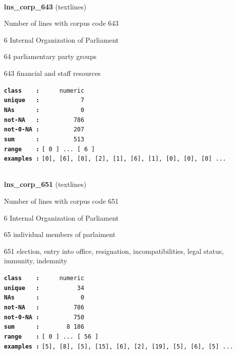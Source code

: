 \documentclass[]{article}
\begin{document}
~

\textbf{lns\_corp\_643} (textlines)

Number of lines with corpus code 643

6 Internal Organization of Parliament

64 parliamentary party groups

643 financial and staff resources

\textbf{\texttt{class\ \ \ \ :}} \texttt{~~~~~numeric}\\
\textbf{\texttt{unique\ \ \ :}} \texttt{~~~~~~~~~~~7}\\
\textbf{\texttt{NAs\ \ \ \ \ \ :}} \texttt{~~~~~~~~~~~0}\\
\textbf{\texttt{not-NA\ \ \ :}} \texttt{~~~~~~~~~786}\\
\textbf{\texttt{not-0-NA\ :}} \texttt{~~~~~~~~~207}\\
\textbf{\texttt{sum\ \ \ \ \ \ :}} \texttt{~~~~~~~~~513}\\
\textbf{\texttt{range\ \ \ \ :}}
\texttt{{[}\ 0\ {]}\ ...\ {[}\ 6\ {]}}\\
\textbf{\texttt{examples\ :}}
\texttt{{[}0{]},\ {[}6{]},\ {[}0{]},\ {[}2{]},\ {[}1{]},\ {[}6{]},\ {[}1{]},\ {[}0{]},\ {[}0{]},\ {[}0{]}\ ...}\\

~

\textbf{lns\_corp\_651} (textlines)

Number of lines with corpus code 651

6 Internal Organization of Parliament

65 individual members of parlaiment

651 election, entry into office, resignation, incompatibilities, legal
status, immunity, indemnity

\textbf{\texttt{class\ \ \ \ :}} \texttt{~~~~~numeric}\\
\textbf{\texttt{unique\ \ \ :}} \texttt{~~~~~~~~~~34}\\
\textbf{\texttt{NAs\ \ \ \ \ \ :}} \texttt{~~~~~~~~~~~0}\\
\textbf{\texttt{not-NA\ \ \ :}} \texttt{~~~~~~~~~786}\\
\textbf{\texttt{not-0-NA\ :}} \texttt{~~~~~~~~~750}\\
\textbf{\texttt{sum\ \ \ \ \ \ :}} \texttt{~~~~~~~8~186}\\
\textbf{\texttt{range\ \ \ \ :}}
\texttt{{[}\ 0\ {]}\ ...\ {[}\ 56\ {]}}\\
\textbf{\texttt{examples\ :}}
\texttt{{[}5{]},\ {[}8{]},\ {[}5{]},\ {[}15{]},\ {[}6{]},\ {[}2{]},\ {[}19{]},\ {[}5{]},\ {[}6{]},\ {[}5{]}\ ...}\\
\end{document}
